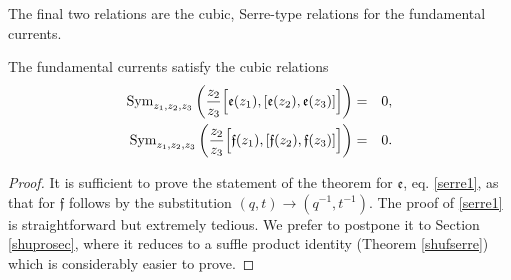 The final two relations are the cubic, Serre-type relations for the fundamental currents.
\begin{thm}\label{thserrre}
The fundamental currents satisfy the cubic relations
\begin{eqnarray}
{\rm Sym}_{z_1,z_2,z_3}\left( \frac{z_2}{z_3} {\Big[}{\mathfrak e}(z_1),{[}{\mathfrak e}(z_2),{\mathfrak e}(z_3){]}{\Big]}\right)&=&0  \label{serre1}, \\
{\rm Sym}_{z_1,z_2,z_3}\left( \frac{z_2}{z_3} {\Big[}{\mathfrak f}(z_1),{[}{\mathfrak f}(z_2),{\mathfrak f}(z_3){]}{\Big]}\right)&=&0 \label{serre2}.
\end{eqnarray}
\end{thm}
\begin{proof}
It is sufficient to prove the statement of the theorem for
${\mathfrak e}$, eq. \eqref{serre1}, as
that for ${\mathfrak f}$ follows by the substitution $(q,t)\to (q^{-1},t^{-1})$.
The proof of \eqref{serre1} is straightforward but extremely tedious. 
We prefer to postpone it to Section \ref{shuprosec}, where it reduces
to a suffle product identity (Theorem \ref{shufserre}) which is considerably easier to prove.

\end{proof}

